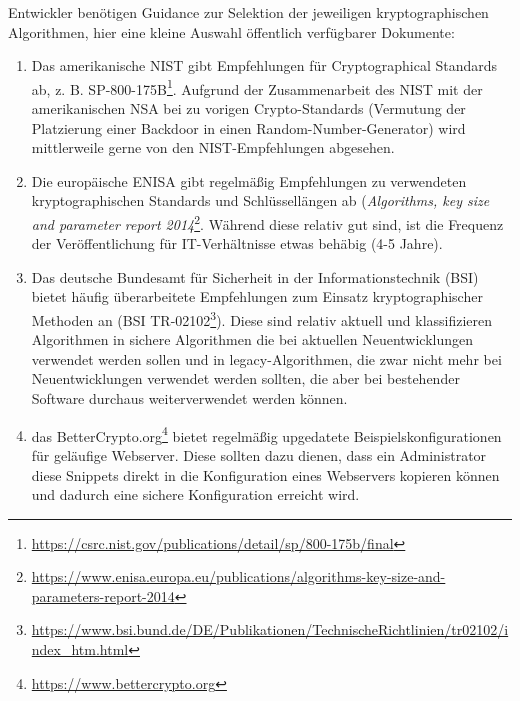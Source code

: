 Entwickler benötigen Guidance zur Selektion der jeweiligen kryptographischen Algorithmen, hier eine kleine Auswahl öffentlich verfügbarer Dokumente:

\begin{enumerate}
	\item Das amerikanische NIST gibt Empfehlungen für Cryptographical Standards ab, z. B. SP-800-175B\footnote{\url{https://csrc.nist.gov/publications/detail/sp/800-175b/final}}. Aufgrund der Zusammenarbeit des NIST mit der amerikanischen NSA bei zu vorigen Crypto-Standards (Vermutung der Platzierung einer Backdoor in einen Random-Number-Generator) wird mittlerweile gerne von den NIST-Empfehlungen abgesehen.
	\item Die europäische ENISA gibt regelmäßig Empfehlungen zu verwendeten kryptographischen Standards und Schlüssellängen ab (\textit{Algorithms, key size and parameter report 2014}\footnote{\url{https://www.enisa.europa.eu/publications/algorithms-key-size-and-parameters-report-2014}}. Während diese relativ gut sind, ist die Frequenz der Veröffentlichung für IT-Verhältnisse etwas behäbig (4-5 Jahre).
	\item Das deutsche Bundesamt für Sicherheit in der Informationstechnik (BSI) bietet häufig überarbeitete Empfehlungen zum Einsatz kryptographischer Methoden an (BSI TR-02102\footnote{\url{https://www.bsi.bund.de/DE/Publikationen/TechnischeRichtlinien/tr02102/index_htm.html}}). Diese sind relativ aktuell und klassifizieren Algorithmen in sichere Algorithmen die bei aktuellen Neuentwicklungen verwendet werden sollen und in legacy-Algorithmen, die zwar nicht mehr bei Neuentwicklungen verwendet werden sollten, die aber bei bestehender Software durchaus weiterverwendet werden können.
	\item das BetterCrypto.org\footnote{\url{https://www.bettercrypto.org}} bietet regelmäßig upgedatete Beispielskonfigurationen für geläufige Webserver. Diese sollten dazu dienen, dass ein Administrator diese Snippets direkt in die Konfiguration eines Webservers kopieren können und dadurch eine sichere Konfiguration erreicht wird.
\end{enumerate}

